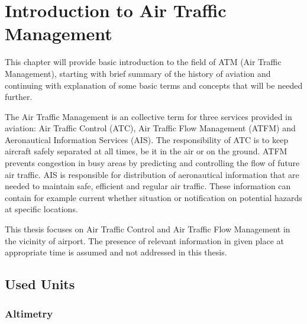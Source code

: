 \chapter{Introduction to Air Traffic Management}

This chapter will provide basic introduction to the field of ATM (Air Traffic Management), starting with brief summary of the history of aviation and continuing with explanation of some basic terms and concepts that will be needed further.

The Air Traffic Management is an collective term for three services provided in aviation: Air Traffic Control (ATC), Air Traffic Flow Management (ATFM) and Aeronautical Information Services (AIS). The responsibility of ATC is to keep aircraft safely separated at all times, be it in the air or on the ground. ATFM prevents congestion in busy areas by predicting and controlling the flow of future air traffic. AIS is responsible for distribution of aeronautical information that are needed to maintain safe, efficient and regular air traffic. These information can contain for example current whether situation or notification on potential hazards at specific locations. \cite{atm}

This thesis focuses on Air Traffic Control and Air Traffic Flow Management in the vicinity of airport. The presence of relevant information in given place at appropriate time is assumed and not addressed in this thesis.







\section{Used Units}


\subsection{Altimetry}





